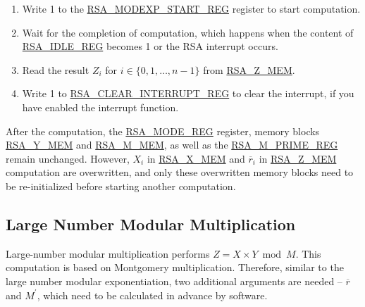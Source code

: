 \documentclass[main\_\_EN.tex]{subfiles}
\begin{document}
\begin{enumerate}
       Users need to write data to each memory block only according to the length of the number; data beyond this length are ignored.

    \item Write 1 to the \hyperref[regdesc:RSAMODEXPSTARTREG]{RSA\_MODEXP\_START\_REG} register to start computation.

    \item Wait for the completion of computation, which happens when the content of \hyperref[regdesc:RSAIDLEREG]{RSA\_IDLE\_REG} becomes 1 or the RSA interrupt occurs.

    \item Read the result \begin{math}Z_{i}\end{math}
        for \begin{math}i \in \{ 0, 1, \dots, n-1 \} \end{math}
        from \hyperref[regdesc:RSAmemory]{RSA\_Z\_MEM}.

    \item Write 1 to \hyperref[regdesc:RSACLEARINTERRUPTREG]{RSA\_CLEAR\_INTERRUPT\_REG} to clear the interrupt, if you have enabled the interrupt function.

\end{enumerate}

After the computation, the \hyperref[regdesc:RSAMODEXPMODEREG]{RSA\_MODE\_REG} register, memory blocks \hyperref[regdesc:RSAmemory]{RSA\_Y\_MEM} and \hyperref[regdesc:RSAmemory]{RSA\_M\_MEM}, as well as the \hyperref[regdesc:RSAMPRIMEREG]{RSA\_M\_PRIME\_REG} remain unchanged. However, \begin{math}X_{i}\end{math} in \hyperref[regdesc:RSAmemory]{RSA\_X\_MEM} and \begin{math}\overline{r}_{i}\end{math} in \hyperref[regdesc:RSAmemory]{RSA\_Z\_MEM} computation are overwritten, and only these overwritten memory blocks need to be re-initialized before starting another computation.

\subsection{Large Number Modular Multiplication}

Large-number modular multiplication performs \begin{math}Z = X \times Y \bmod M\end{math}. This computation is based on Montgomery multiplication.
Therefore, similar to the large number modular exponentiation, two additional arguments are needed -- \begin{math}\overline{r}\end{math} and
\begin{math}M^{\prime}\end{math}, which need to be calculated in advance by software.
\end{document}
